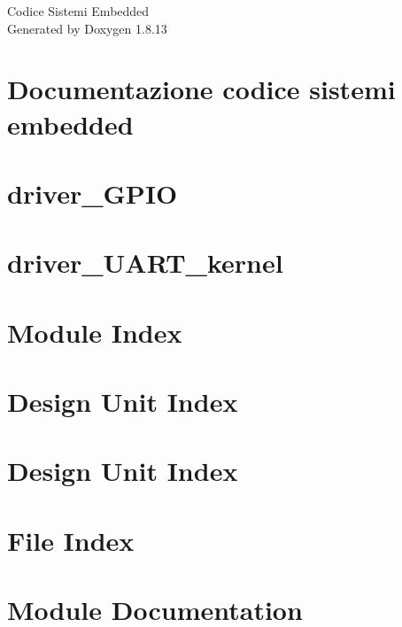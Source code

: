 \documentclass[twoside]{book}
\newcommand{\+}{\discretionary{\mbox{\scriptsize$\hookleftarrow$}}{}{}}
\newcommand{\clearemptydoublepage}{%
  \newpage{\pagestyle{empty}\cleardoublepage}%
}
\begin{document}
\hypersetup{pageanchor=false,
             bookmarksnumbered=true,
             pdfencoding=unicode
            }
\begin{titlepage}
\vspace*{7cm}
\begin{center}%
{\Large Codice Sistemi Embedded }\\
\vspace*{1cm}
{\large Generated by Doxygen 1.8.13}\\
\end{center}
\end{titlepage}
\clearemptydoublepage
{}
\tableofcontents
\clearemptydoublepage
{}
\hypersetup{pageanchor=true}

\chapter{Documentazione codice sistemi embedded}
\label{index}\hypertarget{index}{}
\chapter{driver\+\_\+\+G\+P\+IO}
\label{driver_GPIO}

\chapter{driver\+\_\+\+U\+A\+R\+T\+\_\+kernel}
\label{driver_UART_kernel}

\chapter{Module Index}

\chapter{Design Unit Index}

\chapter{Design Unit Index}

\chapter{File Index}

\chapter{Module Documentation}












\end{document}
